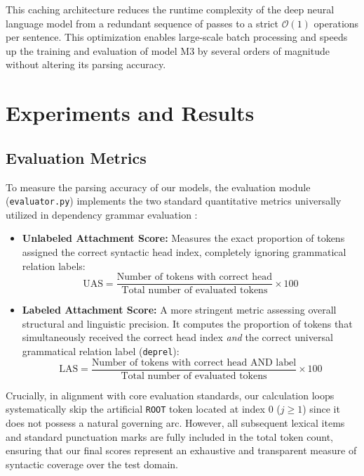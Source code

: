 \documentclass[12pt,a4paper]{article}
\begin{document}
This caching architecture reduces the runtime complexity of the deep neural language model from a redundant sequence of passes to a strict $\mathcal{O}(1)$ operations per sentence. This optimization enables large-scale batch processing and speeds up the training and evaluation of model M3 by several orders of magnitude without altering its parsing accuracy.

\section{Experiments and Results}
\label{sec:experiments_and_results}


\subsection{Evaluation Metrics}
To measure the parsing accuracy of our models, the evaluation module (\texttt{evaluator.py}) implements the two standard quantitative metrics universally utilized in dependency grammar evaluation \cite{jurafsky2026speech}:
\begin{itemize}
    \item \textbf{Unlabeled Attachment Score:} Measures the exact proportion of tokens assigned the correct syntactic head index, completely ignoring grammatical relation labels:
    \begin{equation}
        \text{UAS} = \frac{\text{Number of tokens with correct head}}{\text{Total number of evaluated tokens}} \times 100
    \end{equation}
    \item \textbf{Labeled Attachment Score:} A more stringent metric assessing overall structural and linguistic precision. It computes the proportion of tokens that simultaneously received the correct head index \textit{and} the correct universal grammatical relation label (\texttt{deprel}):
    \begin{equation}
        \text{LAS} = \frac{\text{Number of tokens with correct head AND label}}{\text{Total number of evaluated tokens}} \times 100
    \end{equation}
\end{itemize}

Crucially, in alignment with core evaluation standards, our calculation loops systematically skip the artificial \texttt{ROOT} token located at index $0$ ($j \ge 1$) since it does not possess a natural governing arc. However, all subsequent lexical items and standard punctuation marks are fully included in the total token count, ensuring that our final scores represent an exhaustive and transparent measure of syntactic coverage over the test domain.
\end{document}
